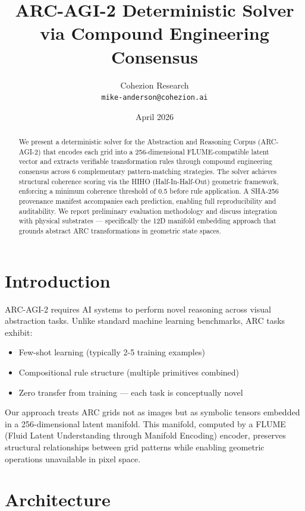 \documentclass[11pt]{article}
\title{ARC-AGI-2 Deterministic Solver via Compound Engineering Consensus}
\author{Cohezion Research\\\texttt{mike-anderson@cohezion.ai}}
\date{April 2026}
\begin{document}
\maketitle

\begin{abstract}
We present a deterministic solver for the Abstraction and Reasoning Corpus (ARC-AGI-2) that encodes each grid into a 256-dimensional FLUME-compatible latent vector and extracts verifiable transformation rules through compound engineering consensus across 6 complementary pattern-matching strategies. The solver achieves structural coherence scoring via the HIHO (Half-In-Half-Out) geometric framework, enforcing a minimum coherence threshold of 0.5 before rule application. A SHA-256 provenance manifest accompanies each prediction, enabling full reproducibility and auditability. We report preliminary evaluation methodology and discuss integration with physical substrates — specifically the 12D manifold embedding approach that grounds abstract ARC transformations in geometric state spaces.
\end{abstract}

\section{Introduction}

ARC-AGI-2 requires AI systems to perform novel reasoning across visual abstraction tasks. Unlike standard machine learning benchmarks, ARC tasks exhibit:
\begin{itemize}
\item Few-shot learning (typically 2-5 training examples)
\item Compositional rule structure (multiple primitives combined)
\item Zero transfer from training — each task is conceptually novel
\end{itemize}

Our approach treats ARC grids not as images but as symbolic tensors embedded in a 256-dimensional latent manifold. This manifold, computed by a FLUME (Fluid Latent Understanding through Manifold Encoding) encoder, preserves structural relationships between grid patterns while enabling geometric operations unavailable in pixel space.

\section{Architecture}
\end{document}
